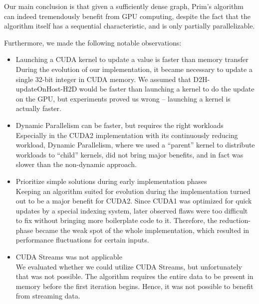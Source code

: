 \documentclass[sigconf,nonacm]{acmart}
\begin{document}
Our main conclusion is that given a sufficiently dense graph, Prim’s algorithm can indeed tremendously benefit from GPU computing, despite the fact that the algorithm itself has a sequential characteristic, and is only partially parallelizable.

Furthermore, we made the following notable observations:
\begin{itemize}
\item Launching a CUDA kernel to update a value is faster than memory transfer\\
During the evolution of our implementation, it became necessary to update a single 32-bit integer in CUDA memory. We assumed that D2H-updateOnHost-H2D would be faster than launching a kernel to do the update on the GPU, but experiments proved us wrong -- launching a kernel is actually faster.

\item Dynamic Parallelism can be faster, but requires the right workloads\\
Especially in the CUDA2 implementation with its continuously reducing workload, Dynamic Parallelism, where we used a “parent” kernel to distribute workloads to “child” kernels, did not bring major benefits, and in fact was slower than the non-dynamic approach.

\item Prioritize simple solutions during early implementation phases\\
Keeping an algorithm suited for evolution during the implementation turned out to be a major benefit for CUDA2. Since CUDA1 was optimized for quick updates by a special indexing system, later observed flaws were too difficult to fix without bringing more boilerplate code to it. Therefore, the reduction-phase became the weak spot of the whole implementation, which resulted in performance fluctuations for certain inputs.

\item CUDA Streams was not applicable\\
We evaluated whether we could utilize CUDA Streams, but unfortunately that was not possible. The algorithm requires the entire data to be present in memory before the first iteration begins. Hence, it was not possible to benefit from streaming data.

\end{itemize}




\end{document}
